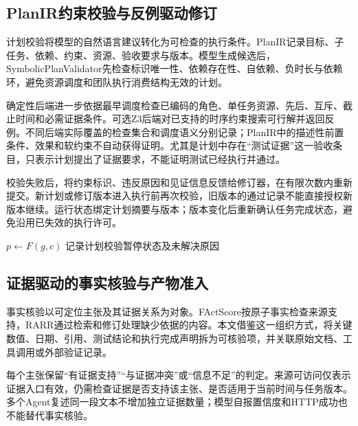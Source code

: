 \subsection{PlanIR约束校验与反例驱动修订}
\label{sec:neuro_symbolic_coordination}

计划校验将模型的自然语言建议转化为可检查的执行条件。PlanIR记录目标、子任务、依赖、约束、资源、验收要求与版本。模型生成候选后，SymbolicPlanValidator先检查标识唯一性、依赖存在性、自依赖、负时长与依赖环，避免资源调度和团队执行消费结构无效的计划。

确定性后端进一步依据最早调度检查已编码的角色、单任务资源、先后、互斥、截止时间和必需证据条件。可选Z3后端对已支持的时序约束搜索可行解并返回反例。不同后端实际覆盖的检查集合和调度语义分别记录；PlanIR中的描述性前置条件、效果和软约束不自动获得证明。尤其是计划中存在“测试证据”这一验收条目，只表示计划提出了证据要求，不能证明测试已经执行并通过。

校验失败后，将约束标识、违反原因和见证信息反馈给修订器，在有限次数内重新提交。新计划或修订版本进入执行前再次校验，旧版本的通过记录不能直接授权新版本继续。运行状态绑定计划摘要与版本；版本变化后重新确认任务完成状态，避免沿用已失效的执行许可。

\begin{algorithm}[htbp]
\caption{反例驱动的有限计划校验与修订}
\label{alg:neuro_symbolic_validation}
$p\leftarrow F(g,c)$\;
记录计划校验暂停状态及未解决原因\;
\end{algorithm}

\subsection{证据驱动的事实核验与产物准入}

事实核验以可定位主张及其证据关系为对象。FActScore按原子事实检查来源支持，RARR通过检索和修订处理缺少依据的内容\cite{tide_factscore,tide_rarr}。本文借鉴这一组织方式，将关键数值、日期、引用、测试结论和执行完成声明拆为可核验项，并关联原始文档、工具调用或外部验证记录。

每个主张保留“有证据支持”“与证据冲突”或“信息不足”的判定。来源可访问仅表示证据入口有效，仍需检查证据是否支持该主张、是否适用于当前时间与任务版本。多个Agent复述同一段文本不增加独立证据数量；模型自报置信度和HTTP成功也不能替代事实核验。

